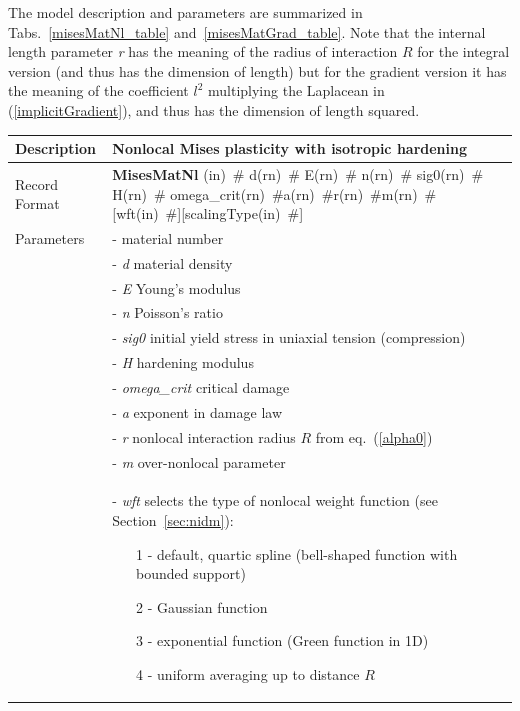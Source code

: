 \documentclass[a4paper]{article}
\newcommand{\descitem}[1]{{\noindent \bf #1}}
\newcommand{\elemparam}[2]{{{#1\tiny (#2)}~\#}}
\newcommand{\param}[1]{{\it #1}}
\newenvironment{mmt}{\begin{tabular}{|l|p{9cm}|}}{\end{tabular}\\}
\newenvironment{mmt}{\begin{tabular}{|l|l|}}{\end{tabular}\\}
\begin{document}
The model description and parameters are summarized in Tabs.~\ref{misesMatNl_table} and~\ref{misesMatGrad_table}. Note that the internal length parameter \param{r} has the meaning of the
radius of interaction $R$ for the integral version (and thus has the dimension
of length) but for the gradient version it has the meaning of the coefficient $l^2$
multiplying the Laplacean in (\ref{implicitGradient}), and thus has the dimension of length squared.
\begin{table}[!htb]
\begin{mmt}
\hline
Description & Nonlocal Mises plasticity with isotropic hardening\\
\hline
Record Format & \descitem{MisesMatNl} \elemparam{}{in} \elemparam{d}{rn} \elemparam{E}{rn} \elemparam{n}{rn} 
\elemparam{sig0}{rn} \elemparam{H}{rn} \elemparam{omega\_crit}{rn}\elemparam{a}{rn}\elemparam{r}{rn}\elemparam{m}{rn}[\elemparam{wft}{in}][\elemparam{scalingType}{in}] \\
Parameters &- \param{} material number\\
&- \param{d} material density\\
&- \param{E} Young's modulus\\
&- \param{n} Poisson's ratio\\
&- \param{sig0} initial yield stress in uniaxial tension (compression)\\
&- \param{H} hardening modulus\\
&- \param{omega\_crit} critical damage\\
&- \param{a} exponent in damage law\\
&- \param{r} nonlocal interaction radius $R$  from eq.~(\ref{alpha0})\\
&- \param{m} over-nonlocal parameter\\
&- \param{wft} selects the type of nonlocal weight function (see Section~\ref{sec:nidm}):
\begin{itemize}\setlength{\itemsep}{-3pt}
\item[1 -] default, quartic spline (bell-shaped function with bounded support)
\item[2 -] Gaussian function
\item[3 -] exponential function (Green function in 1D)
\item[4 -] uniform averaging up to distance $R$

\end{itemize}
\end{mmt}
\end{table}
\end{document}
